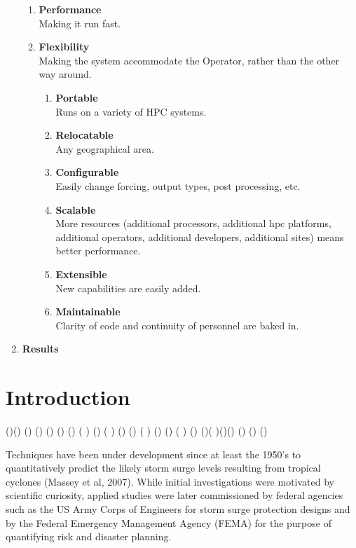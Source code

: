 \documentclass[12pt]{article}
\begin{document}
\begin{enumerate}
\begin{enumerate}
\item \textbf{Performance} \\
Making it run fast. 
\item \textbf{Flexibility} \\
Making the system accommodate the Operator, rather than the other way around.
\begin{enumerate}
\item \textbf{Portable} \\
Runs on a variety of HPC systems.
\item \textbf{Relocatable} \\
Any geographical area.
\item \textbf{Configurable} \\
Easily change forcing, output types, post processing, etc.
\item \textbf{Scalable} \\
More resources (additional processors, additional hpc platforms, additional operators, additional developers, additional sites) means better performance.
\item \textbf{Extensible} \\
New capabilities are easily added.
\item \textbf{Maintainable} \\
Clarity of code and continuity of personnel are baked in.
\end{enumerate}
\end{enumerate}
\item \textbf{Results}
\end{enumerate}

\section{Introduction}

(\cite{LynchDR2004})(\cite{ASGSOperatorsGuide2011}) (\cite 
{ASGSDevelopersGuide2011}) (\cite{DietrichJC2012}) (\cite 
{FlatherRA1994}) (\cite{GraberHC2006}) (\cite {HollandGJ1980}) (
\cite {HoustonSH1999}) (\cite{HubbertGD1991}) ( \cite 
{LynchDR2004}) (\cite {MasseyWG2007}) (\cite{OConnorWP1999}) ( \cite
{VerlaanM2005}) (\cite {XieL2006})  (\cite{KennedyA2010}) ( \cite
{GlahnB2009}) (\cite{GlahnB2009}) (\cite{KimSC1996})( \cite
{BooijN1999})(\cite {ChuP2009})(\cite{DietrichJC2013}) (\cite
{BlantonBO2012}) (\cite{LeProvostC1998}) (\cite{LosegoJL2012})

Techniques have been under development since at least the 1950’s to 
quantitatively predict the likely storm surge levels resulting from 
tropical cyclones (Massey et al, 2007). While initial investigations 
were motivated by scientific curiosity, applied studies were later 
commissioned by federal agencies such as the US Army Corps of 
Engineers for storm surge protection designs and by the Federal 
Emergency Management Agency (FEMA) for the purpose of quantifying 
risk and disaster planning. 
\end{document}
